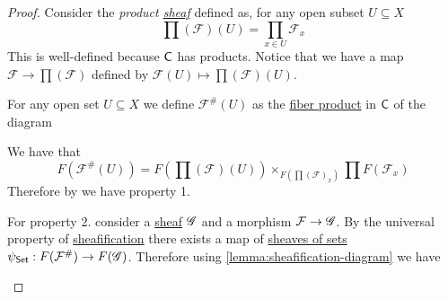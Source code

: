 \documentclass[../../../main]{subfiles}
\begin{document}
\begin{proof}
  Consider the \textit{product \hyperref[def:sheaf]{sheaf}} defined as, for any open subset \(U \subseteq X\)
  \begin{equation*}
    \prod(\mathcal{F})(U) = \prod_{x \in U} \mathcal{F}_{x}
  \end{equation*}
  This is well-defined because \(\mathsf{C}\) has products.
  Notice that we have a map \(\mathcal{F} \to \prod(\mathcal{F})\) defined by \(\mathcal{F}(U) \mapsto \prod(\mathcal{F})(U)\).

  For any open set \(U \subseteq X\) we define \(\mathcal{F}^{\#}(U)\) as the \hyperref[def:fibre-product]{fiber product} in \(\mathsf{C}\) of the diagram
  \begin{center}
  \end{center}

  We have that
  \begin{equation*}
    F(\mathcal{F}^{\#}(U)) = F \left( \prod(\mathcal{F})(U) \right) \times_{F \left( \prod(\mathcal{F})_{x} \right)} \prod F(\mathcal{F}_{x})
  \end{equation*}
  Therefore by \cite[\href{https://stacks.math.columbia.edu/tag/0084}{Lemma 0084}]{stacks-project} we have property 1.

  For property 2. consider a \hyperref[def:sheaf]{sheaf} \(\mathscr{G}\) and a morphism \(\mathcal{F} \to \mathscr{G}\).
  By the universal property of \hyperref[def:sheafification]{sheafification} there exists a map of \hyperref[def:set-valued-sheaf]{sheaves of sets} \(\psi_{\mathsf{Set}}: F(\mathcal{F}^{\#}) \to F(\mathscr{G})\).
  Therefore using \autoref{lemma:sheafification-diagram} we have
  \begin{center}
  \end{center}
\end{proof}
\end{document}
